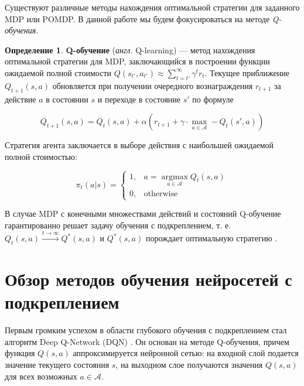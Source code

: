 \documentclass[specification,annotation,times]{itmo-student-thesis}
\DeclareMathOperator{\argmax}{argmax}
\theoremstyle{definition}
\newtheorem{definition-ru}{Определение}
\begin{document}
Существуют различные методы нахождения оптимальной стратегии для заданного MDP
или POMDP. В данной работе мы будем фокусироваться на методе \textit{Q-обучения}.

\begin{definition-ru}
  \textbf{Q-обучение} (\textit{англ.} Q-learning) \cite{q-learning-orig} ---
  метод нахождения оптимальной стратегии для MDP, заключающийся в построении
  функции ожидаемой полной стоимости
  $Q(s_{t'}, a_{t'}) \approx \sum\limits_{t=t'}^{\infty} \gamma^t r_t$. Текущее
  приближение $Q_{t+1}(s, a)$ обновляется при получении очередного
  вознаграждения $r_{t+1}$ за действие $a$ в состоянии $s$ и переходе в
  состояние $s'$ по формуле

  \begin{equation}\label{eq:q-learning}
    Q_{t+1}(s, a) = Q_t(s, a) + \alpha \left( r_{t+1} +
    \gamma \cdot \max\limits_{a \in \mathcal{A}} - Q_t(s', a) \right)
  \end{equation}

  Стратегия агента заключается в выборе действия с наибольшей ожидаемой полной
  стоимостью:

  \begin{equation}
    \pi_t(a | s) = \begin{cases}
      1, & a = \argmax\limits_{a \in \mathcal{A}} {Q_t(s, a)}\\
      0, & \text{otherwise}
    \end{cases}
  \end{equation}
\end{definition-ru}

В случае MDP с конечными множествами действий и состояний Q-обучение
гарантированно решает задачу обучения с подкреплением, т. е.
$Q_t(s, a) \xrightarrow{t \rightarrow \infty} Q^*(s, a)$ и $Q^*(s, a)$ порождает
оптимальную стратегию \cite{q-learning-orig}.

\section{Обзор методов обучения нейросетей с подкреплением}\label{overview:nns}

Первым громким успехом в области глубокого обучения с подкреплением стал
алгоритм Deep Q-Network (DQN) \cite{deepmind-dqn-orig}. Он основан на методе
Q-обучения, причем функция $Q(s, a)$ аппроксимируется нейронной сетью: на
входной слой подается значение текущего состояния $s$, на выходном слое
получаются значения $Q(s, a)$ для всех возможных $a \in \mathcal{A}$. 
\end{document}
